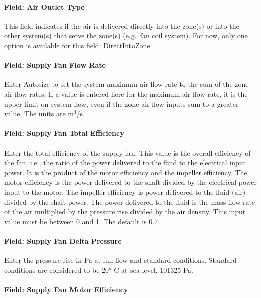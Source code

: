 \paragraph{Field: Air Outlet Type}\label{field-air-outlet-type}

This field indicates if the air is delivered directly into the zone(s) or into the other system(s) that serve the zone(s) (e.g.~fan coil system). For now, only one option is available for this field: DirectIntoZone.

\paragraph{Field: Supply Fan Flow Rate}\label{field-supply-fan-flow-rate}

Enter Autosize to set the system maximum air-flow rate to the sum of the zone air flow rates. If a value is entered here for the maximum air-flow rate, it is the upper limit on system flow, even if the zone air flow inputs sum to a greater value. The units are m\(^{3}\)/s.

\paragraph{Field: Supply Fan Total Efficiency}\label{field-supply-fan-total-efficiency-11}

Enter the total efficiency of the supply fan. This value is the overall efficiency of the fan, i.e., the ratio of the power delivered to the fluid to the electrical input power. It is the product of the motor efficiency and the impeller efficiency. The motor efficiency is the power delivered to the shaft divided by the electrical power input to the motor. The impeller efficiency is power delivered to the fluid (air) divided by the shaft power. The power delivered to the fluid is the mass flow rate of the air multiplied by the pressure rise divided by the air density. This input value must be between 0 and 1. The default is 0.7.

\paragraph{Field: Supply Fan Delta Pressure}\label{field-supply-fan-delta-pressure-10}

Enter the pressure rise in Pa at full flow and standard conditions. Standard conditions are considered to be 20\(^{o}\) C at sea level, 101325 Pa.

\paragraph{Field: Supply Fan Motor Efficiency}\label{field-supply-fan-motor-efficiency-11}

